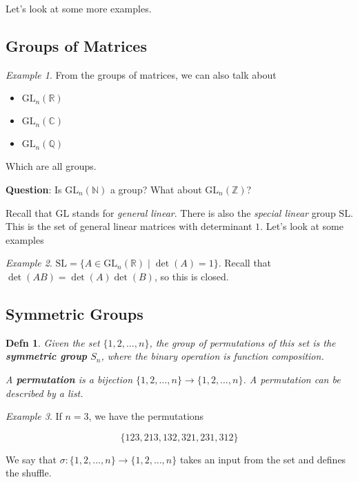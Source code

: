 \documentclass[12pt]{article}
\def\gl{\text{GL}}
\def\sl{\text{SL}}
\def\N{{\mathbb N}}
\def\Z{{\mathbb Z}}
\def\Q{{\mathbb Q}}
\def\R{{\mathbb R}}
\def\C{{\mathbb C}}
\newtheorem{definition}{Defn}
\theoremstyle{remark}
\theoremstyle{remark}
\theoremstyle{remark}
\newtheorem{example}{Example}
\theoremstyle{remark}
\theoremstyle{remark}
\begin{document}
Let's look at some more examples.

\subsection{Groups of Matrices}

\begin{example}
	From the groups of matrices, we can also talk about

	\begin{itemize}
		\item $\gl_n(\R)$
		\item $\gl_n(\C)$
		\item $\gl_n(\Q)$
	\end{itemize}

	Which are all groups.

  {\bf Question}: Is $\gl_n(\N)$ a group? What about $\gl_n(\Z)$?
\end{example}

Recall that $\gl$ stands for {\it general linear}. There is also the {\it
special linear} group $\sl$. This is the set of general linear matrices with
determinant $1$. Let's look at some examples

\begin{example}
  $\sl = \{ A \in \gl_n(\R) \mid \det(A) = 1\}$. Recall that $\det(AB) = \det(A)
  \det(B)$, so this is closed.
\end{example}

\subsection{Symmetric Groups}

\begin{definition}
	Given the set $\{1, 2, \dots, n\}$, the group of {\it permutations} of this
	set is the {\bf symmetric group} $S_n$, where the binary operation is {\it
			function composition}.

	A {\bf permutation} is a bijection $\{1, 2, \dots, n\} \to \{1, 2, \dots, n\}$.
	A permutation can be described by a list.
\end{definition}

\begin{example}
	If $n = 3$, we have the permutations

	\[
		\{123, 213, 132, 321, 231, 312 \}
	\]

	We say that $\sigma: \{1, 2, \dots, n\} \to \{1, 2, \dots, n\}$ takes an input
	from the set and defines the shuffle.
\end{example}
\end{document}
